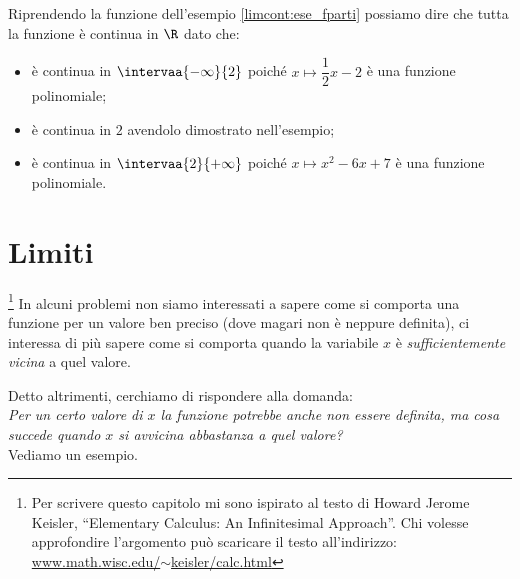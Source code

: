 \begin{esempio}
Riprendendo la funzione dell'esempio \ref{limcont:ese_fparti}
possiamo dire che tutta la funzione è continua in \(\R\) dato che:
\begin{itemize}
\item è continua in \(\intervaa{-\infty}{2}\) 
poiché \(x \mapsto \dfrac{1}{2}x -2\) è una funzione polinomiale;
\item è continua in \(2\) avendolo dimostrato nell'esempio;
\item è continua in \(\intervaa{2}{+\infty}\)
poiché \(x \mapsto x^2 -6x +7\) è una funzione polinomiale.
\end{itemize}
\end{esempio}



\newpage %

\section{Limiti}
\label{sec:cont_limiti}

\footnote{Per scrivere questo capitolo mi sono ispirato 
al testo di Howard Jerome Keisler, 
``Elementary Calculus: An Infinitesimal Approach''. 
Chi volesse approfondire l'argomento può scaricare il testo all'indirizzo: 
\href{https://www.math.wisc.edu/~keisler/calc.html}
     {www.math.wisc.edu/\(\sim\)keisler/calc.html}}
In alcuni problemi non siamo interessati a sapere come si comporta una 
funzione per un valore ben preciso (dove magari non è neppure definita), ci 
interessa di più sapere come si comporta quando la variabile \(x\) è 
\emph{sufficientemente vicina} a quel valore.

Detto altrimenti, cerchiamo di rispondere alla domanda: \\
\emph{Per un certo valore di \(x\) la funzione potrebbe anche \emph{non} 
essere definita, ma cosa succede quando \(x\) si avvicina abbastanza a quel 
valore?} \\
Vediamo un esempio.

